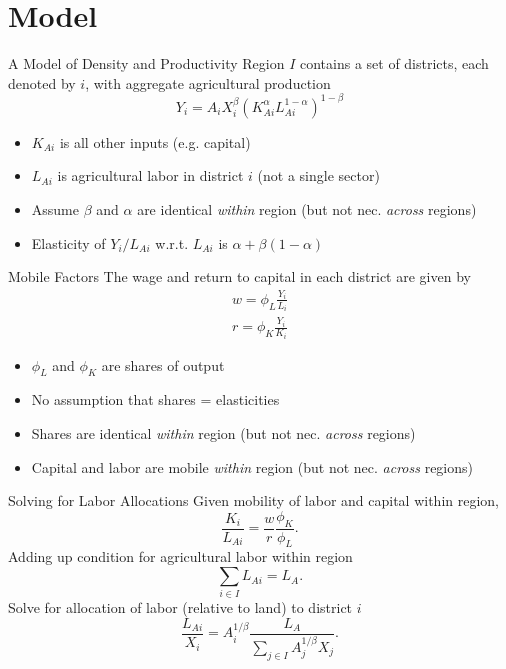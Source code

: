 \documentclass[10pt, xcolor=dvipsnames]{beamer}
\begin{document}
\section{Model}

\begin{frame}{A Model of Density and Productivity}
Region $I$ contains a set of districts, each denoted by $i$, with aggregate agricultural production
\begin{equation}
Y_{i} = A_{i} X_{i}^{\beta} \left(K_{Ai}^{\alpha}L_{Ai}^{1-\alpha}\right)^{1-\beta} \label{EQ_production}
\end{equation}
\begin{itemize}
  \item $K_{Ai}$ is all other inputs (e.g. capital)
  \item $L_{Ai}$ is agricultural labor in district $i$ (not a single sector)
  \item Assume $\beta$ and $\alpha$ are identical \textit{within} region (but not nec. \textit{across} regions)
  \item Elasticity of $Y_i/L_{Ai}$ w.r.t. $L_{Ai}$ is $\alpha + \beta(1-\alpha)$
\end{itemize}
\end{frame}

\begin{frame}{Mobile Factors}
The wage and return to capital in each district are given by 
\begin{eqnarray}
    w = \phi_L \frac{Y_i}{L_i} \\ \nonumber
    r = \phi_K \frac{Y_i}{K_i} \label{EQ_factorprices}
\end{eqnarray}
\begin{itemize}
  \item $\phi_L$ and $\phi_K$ are shares of output 
  \item No assumption that shares = elasticities
  \item Shares are identical \textit{within} region (but not nec. \textit{across} regions)
  \item Capital and labor are mobile \textit{within} region (but not nec. \textit{across} regions)
\end{itemize}
\end{frame}

\begin{frame}{Solving for Labor Allocations}
Given mobility of labor and capital within region,
\begin{equation}
    \frac{K_i}{L_{Ai}} = \frac{w}{r}\frac{\phi_K}{\phi_L}.
\end{equation}
Adding up condition for agricultural labor within region
\begin{equation}
\sum_{i\in I} L_{Ai} = L_A.
\end{equation}
Solve for allocation of labor (relative to land) to district $i$
\begin{equation}
\frac{L_{Ai}}{X_i} = A_{i}^{1/\beta}\frac{L_A}{\sum_{j\in I} A_{j}^{1/\beta}X_{j}}. \label{EQ_LaX}
\end{equation}
\end{frame}
\end{document}
